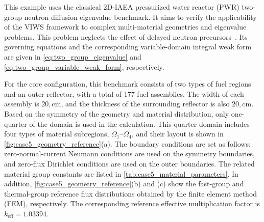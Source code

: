 \documentclass[final,3p,times,sort&compress]{elsarticle}
\begin{document}
This example uses the classical 2D-IAEA pressurized water reactor (PWR) two-group neutron diffusion eigenvalue benchmark. It aims to verify the applicability of the VIWS framework to complex multi-material geometries and eigenvalue problems. This problem neglects the effect of delayed neutron precursors~\cite{theler2011solution}. Its governing equations and the corresponding variable-domain integral weak form are given in \cref{eq:two_group_eigenvalue} and \cref{eq:two_group_variable_weak_form}, respectively.

For the core configuration, this benchmark consists of two types of fuel regions and an outer reflector, with a total of 177 fuel assemblies. The width of each assembly is $20,\mathrm{cm}$, and the thickness of the surrounding reflector is also $20,\mathrm{cm}$. Based on the symmetry of the geometry and material distribution, only one-quarter of the domain is used in the calculation. This quarter domain includes four types of material subregions, $\Omega_1$--$\Omega_4$, and their layout is shown in \cref{fig:case5_geometry_reference}(a). The boundary conditions are set as follows: zero-normal-current Neumann conditions are used on the symmetry boundaries, and zero-flux Dirichlet conditions are used on the outer boundaries. The related material group constants are listed in \cref{tab:case5_material_parameters}. In addition, \cref{fig:case5_geometry_reference}(b) and (c) show the fast-group and thermal-group reference flux distributions obtained by the finite element method (FEM), respectively. The corresponding reference effective multiplication factor is $k_{\mathrm{eff}}=1.03394$.
\end{document}
